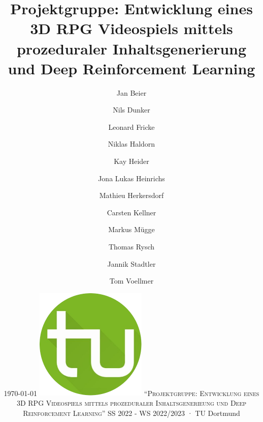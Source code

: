 %
%
\newcommand\svperson{Jan Beier, Nils Dunker, Leonard Fricke, Niklas Haldorn, Kay Heider, \linebreak Jona Lukas Heinrichs, Mathieu Herkersdorf, Carsten Kellner, Markus Mügge, Thomas Rysch, Jannik Stadtler, Tom Voellmer}
\newcommand\svdatum{\today} %
\newcommand\lvname{Projektgruppe: Entwicklung eines 3D RPG Videospiels mittels prozeduraler Inhaltsgenerieung und Deep Reinforcement Learning}
\newcommand\lvtyp{SS 2022 - WS 2022/2023}
\newcommand\lvinst{TU Dortmund}



	
	\title{ \huge\textbf{Projektgruppe: \linebreak \linebreak Entwicklung eines 3D RPG Videospiels mittels prozeduraler Inhaltsgenerierung und Deep Reinforcement Learning} }
	\author{Jan Beier \and Nils Dunker \and Leonard Fricke \and Niklas Haldorn \and Kay Heider \and Jona Lukas Heinrichs \and Mathieu Herkersdorf \and Carsten Kellner \and Markus Mügge \and Thomas Rysch \and Jannik Stadtler \and Tom Voellmer}
	\date{\LARGE{\svdatum} \linebreak \linebreak \normalsize \centering \includegraphics[width=0.4\textwidth]{resources/img/tu-dortmund.png} \linebreak \linebreak \large\textsc{"`\lvname"'} \linebreak \linebreak \large{\lvtyp} · \large{\lvinst}}
	
	\maketitle
	\thispagestyle{empty} %
